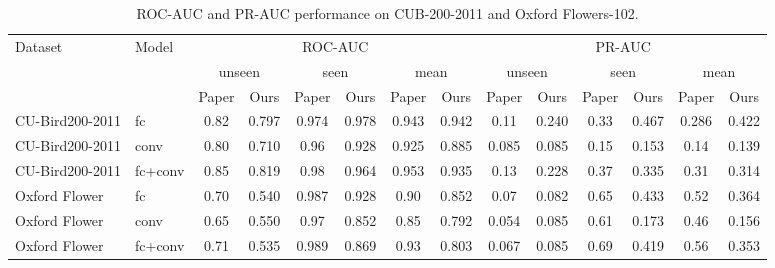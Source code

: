 
\begin{table}[t]
\centering
\scriptsize
\caption{ROC-AUC and PR-AUC performance on CUB-200-2011 and Oxford Flowers-102.}
\label{tab:table1}
\begin{tabular}{llcccccccccccc}
\toprule
Dataset & Model & \multicolumn{6}{c}{ROC-AUC} & \multicolumn{6}{c}{PR-AUC} \\
\cmidrule(lr){3-8} \cmidrule(lr){9-14}
 & & \multicolumn{2}{c}{unseen} & \multicolumn{2}{c}{seen} & \multicolumn{2}{c}{mean} & \multicolumn{2}{c}{unseen} & \multicolumn{2}{c}{seen} & \multicolumn{2}{c}{mean} \\
\cmidrule(lr){3-4} \cmidrule(lr){5-6} \cmidrule(lr){7-8} \cmidrule(lr){9-10} \cmidrule(lr){11-12} \cmidrule(lr){13-14}
 & & Paper & Ours & Paper & Ours & Paper & Ours & Paper & Ours & Paper & Ours & Paper & Ours \\
\midrule
CU-Bird200-2011 & fc & 0.82 & 0.797 & 0.974 & 0.978 & 0.943 & 0.942 & 0.11 & 0.240 & 0.33 & 0.467 & 0.286 & 0.422 \\
CU-Bird200-2011 & conv & 0.80 & 0.710 & 0.96 & 0.928 & 0.925 & 0.885 & 0.085 & 0.085 & 0.15 & 0.153 & 0.14 & 0.139 \\
CU-Bird200-2011 & fc+conv & 0.85 & 0.819 & 0.98 & 0.964 & 0.953 & 0.935 & 0.13 & 0.228 & 0.37 & 0.335 & 0.31 & 0.314 \\
Oxford Flower & fc & 0.70 & 0.540 & 0.987 & 0.928 & 0.90 & 0.852 & 0.07 & 0.082 & 0.65 & 0.433 & 0.52 & 0.364 \\
Oxford Flower & conv & 0.65 & 0.550 & 0.97 & 0.852 & 0.85 & 0.792 & 0.054 & 0.085 & 0.61 & 0.173 & 0.46 & 0.156 \\
Oxford Flower & fc+conv & 0.71 & 0.535 & 0.989 & 0.869 & 0.93 & 0.803 & 0.067 & 0.085 & 0.69 & 0.419 & 0.56 & 0.353 \\
\bottomrule
\end{tabular}
\end{table}

